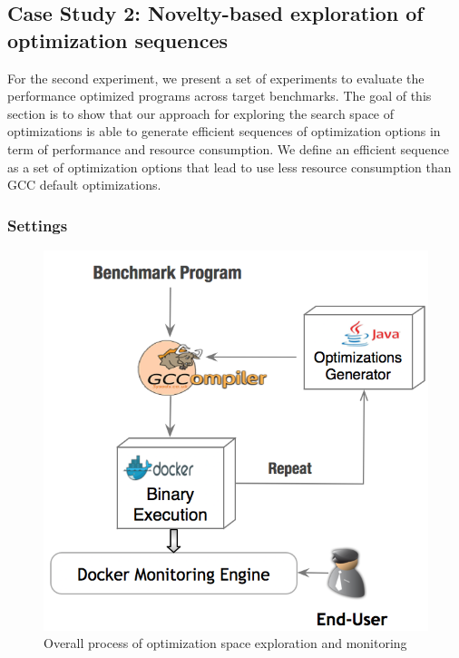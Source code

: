 \subsection{Case Study 2: Novelty-based exploration of optimization sequences}
For the second experiment, we present a set of experiments to evaluate the performance optimized programs across target benchmarks. The goal of this section
is to show that our approach for exploring the search space of optimizations is able to generate efficient sequences of optimization options in term of performance and
resource consumption. We define an efficient sequence as a
set of optimization options that lead to use less resource consumption than GCC default optimizations.
\subsubsection{Settings}
\begin{figure}[h]
	\centering
	\includegraphics[scale=0.50]{Ressources/infra_novelty.png}
	\caption{Overall process of optimization space exploration and monitoring}
\end{figure}
